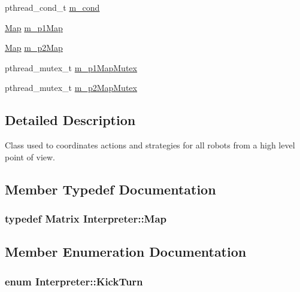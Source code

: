 \begin{DoxyCompactItemize}
\item 
pthread\_\-cond\_\-t \hyperlink{classInterpreter_a9239b5f00f922f05a3902538784f5777}{m\_\-cond}
\item 
\hyperlink{classMatrix}{Map} \hyperlink{classInterpreter_a4c923fac8d283ef70a03812fce74ef47}{m\_\-p1Map}
\item 
\hyperlink{classMatrix}{Map} \hyperlink{classInterpreter_a9704ad86fdf8eddecfe191d8540fb4ef}{m\_\-p2Map}
\item 
pthread\_\-mutex\_\-t \hyperlink{classInterpreter_a849d1195573a32632ae33cd7ecd4bec7}{m\_\-p1MapMutex}
\item 
pthread\_\-mutex\_\-t \hyperlink{classInterpreter_a76012913dbff07096d081b2380c2c7a8}{m\_\-p2MapMutex}
\end{DoxyCompactItemize}


\subsection{Detailed Description}
Class used to coordinates actions and strategies for all robots from a high level point of view. 

\subsection{Member Typedef Documentation}
\hypertarget{classInterpreter_a4c080f069f557cf92dfe803117a6ea53}{
\subsubsection[{Map}]{\setlength{\rightskip}{0pt plus 5cm}typedef {\bf Matrix} {\bf Interpreter::Map}}}
\label{classInterpreter_a4c080f069f557cf92dfe803117a6ea53}


\subsection{Member Enumeration Documentation}
\hypertarget{classInterpreter_ac7c3ba77d973ffbb84b12db662cfe643}{
\subsubsection[{KickTurn}]{\setlength{\rightskip}{0pt plus 5cm}enum {\bf Interpreter::KickTurn}}}
\label{classInterpreter_ac7c3ba77d973ffbb84b12db662cfe643}



